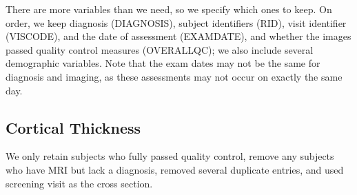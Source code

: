 \documentclass[
]{article}
\newenvironment{Shaded}{\begin{snugshade}}{\end{snugshade}}
\newcommand{\DataTypeTok}[1]{\textcolor[rgb]{0.13,0.29,0.53}{#1}}
\newcommand{\KeywordTok}[1]{\textcolor[rgb]{0.13,0.29,0.53}{\textbf{#1}}}
\newcommand{\NormalTok}[1]{#1}
\newcommand{\OperatorTok}[1]{\textcolor[rgb]{0.81,0.36,0.00}{\textbf{#1}}}
\newcommand{\StringTok}[1]{\textcolor[rgb]{0.31,0.60,0.02}{#1}}
\begin{document}
There are more variables than we need, so we specify which ones to keep.
On order, we keep diagnosis (DIAGNOSIS), subject identifiers (RID),
visit identifier (VISCODE), and the date of assessment (EXAMDATE), and
whether the images passed quality control measures (OVERALLQC); we also
include several demographic variables. Note that the exam dates may not
be the same for diagnosis and imaging, as these assessments may not
occur on exactly the same day.

\begin{Shaded}
\end{Shaded}

\hypertarget{cortical-thickness}{%
\subsection{Cortical Thickness}\label{cortical-thickness}}

We only retain subjects who fully passed quality control, remove any
subjects who have MRI but lack a diagnosis, removed several duplicate
entries, and used screening visit as the cross section.
\end{document}
